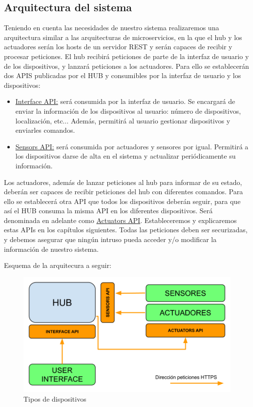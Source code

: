 \subsection{Arquitectura del sistema}
Teniendo en cuenta las necesidades de nuestro sistema realizaremos una arquitectura similar a las arquitecturas de microservicios,
en la que el hub y los actuadores serán los hosts de un servidor REST y serán capaces de recibir y procesar peticiones.
\newline
El hub recibirá peticiones de parte de la interfaz de usuario y de los dispositivos, y lanzará peticiones a los actuadores.
Para ello se establecerán dos APIS publicadas por el HUB y consumibles por la interfaz de usuario y los dispositivos:
\begin{itemize}
\item \underline{Interface API:} será consumida por la interfaz de usuario. Se encargará de enviar la información de los dispositivos al usuario: número
 de dispositivos, localización, etc... Además, permitirá al usuario gestionar dispositivos y enviarles comandos.
\item \underline{Sensors API:} será consumida por actuadores y sensores por igual. Permitirá a los dispositivos darse de alta en el sistema y actualizar
periódicamente su información.
\end{itemize}
Los actuadores, además de lanzar peticiones al hub para informar de su estado, deberán ser capaces de recibir peticiones del hub con
diferentes comandos. Para ello se establecerá otra API que todos los dispositivos deberán seguir, para que así el HUB consuma la misma API
en los diferentes dispositivos. Será denominada en adelante como \underline{Actuators API}.
\newline
Estableceremos y explicaremos estas APIs en los capítulos siguientes.
\newline
Todas las peticiones deben ser securizadas, y debemos asegurar que ningún intruso pueda acceder y/o modificar la información de nuestro sistema.

Esquema de la arquitecura a seguir:
\begin{figure}[H]
\centering
\includegraphics[width=6.00in]{images/esquema_arquitectura.png}
\caption{Tipos de dispositivos}
\label{fig:descripcion_dispositivos}
\end{figure}

